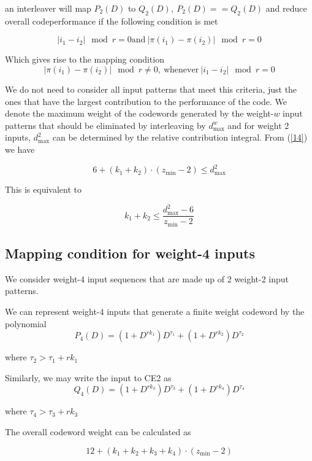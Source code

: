 \documentclass[11pt, oneside, dvipdfmx]{book}
\begin{document}
an interleaver will map $P_2(D)$ to $Q_2(D),~P_2(D)==Q_2(D)$ and reduce overall codeperformance if the following condition is met

\begin{equation}
|i_1 -i_2| \mod r =0 \text{and}~|\pi(i_1) - \pi(i_2)| \mod r =0
\end{equation}

Which gives rise to the mapping condition 
\begin{equation}
|\pi(i_1) - \pi(i_2)| \mod r \neq 0 ,~\text{whenever}~ |i_1 -i_2| \mod r =0 
\end{equation}

We do not need to consider all input patterns that meet this criteria, just the ones that have the largest contribution to the performance of the code. We denote the maximum weight of the codewords generated by
the weight-$w$ input patterns that should be eliminated by
interleaving by $d^w_{\text{max}}$ and for weight 2 inputs, $d^2_{\text{max}}$ can be determined by the relative contribution integral. From (\ref{14}) we have 

\begin{equation}
6+(k_1+k_2) \cdot (z_{\min}-2) \leq d^2_{\text{max}}
\end{equation}

This is equivalent to 

\begin{equation}
k_1+k_2  \leq \frac{d^2_{\text{max}}-6}{z_{\min}-2}
\end{equation}

\subsection{Mapping condition for weight-4 inputs}
We consider weight-4 input sequences that are made up of 2 weight-2 input patterns. 


We can represent weight-4 inputs that generate a finite weight codeword by the polynomial $$ P_4(D) =(1 +D^{rk_1})D^{\tau_1} +(1 +D^{rk_2})D^{\tau_2} $$
 
 where $\tau_2 > \tau_1 + rk_1$
 
 Similarly, we may write the input to CE2 as $$ Q_4(D) =(1 +D^{rk_3})D^{\tau_3} +(1 +D^{rk_4})D^{\tau_4}$$
 
  where $\tau_4 > \tau_3 + rk_3$
 
 The overall codeword weight can be calculated as 

\begin{equation}
12+(k_1+k_2+k_3+k_4) \cdot (z_{\min}-2)
\label{14}
\end{equation}
\end{document}
